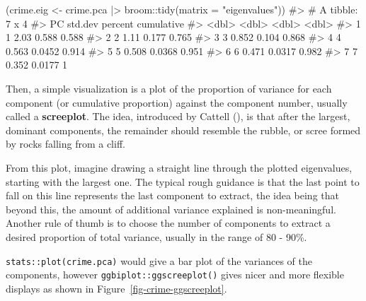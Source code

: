 \documentclass[
  letterpaper,
  10pt,
  krantz2]{krantz}
\makeatletter
\newenvironment{Shaded}{\begin{snugshade}}{\end{snugshade}}
\newcommand{\AttributeTok}[1]{\textcolor[rgb]{0.40,0.45,0.13}{#1}}
\newcommand{\CommentTok}[1]{\textcolor[rgb]{0.37,0.37,0.37}{#1}}
\newcommand{\FunctionTok}[1]{\textcolor[rgb]{0.28,0.35,0.67}{#1}}
\newcommand{\NormalTok}[1]{\textcolor[rgb]{0.00,0.23,0.31}{#1}}
\newcommand{\OtherTok}[1]{\textcolor[rgb]{0.00,0.23,0.31}{#1}}
\newcommand{\SpecialCharTok}[1]{\textcolor[rgb]{0.37,0.37,0.37}{#1}}
\newcommand{\StringTok}[1]{\textcolor[rgb]{0.13,0.47,0.30}{#1}}
\newenvironment{kframe}{%
  \medskip{}
  \setlength{\fboxsep}{.8em}
  \def\at@end@of@kframe{}%
  \ifinner\ifhmode%
  \def\at@end@of@kframe{\end{minipage}}%
  \begin{minipage}{\columnwidth}%
  \fi\fi%
  \def\FrameCommand##1{\hskip\@totalleftmargin \hskip-\fboxsep
  \colorbox{shadecolor}{##1}\hskip-\fboxsep
      \hskip-\linewidth \hskip-\@totalleftmargin \hskip\columnwidth}%
  \MakeFramed {\advance\hsize-\width
    \@totalleftmargin\z@ \linewidth\hsize
    \@setminipage}}%
{\par\unskip\endMakeFramed%
  \at@end@of@kframe}
\renewenvironment{Shaded}{\begin{kframe}}{\end{kframe}}
\makeatother
\begin{document}
\begin{Shaded}
\begin{Highlighting}[]
\NormalTok{(crime.eig }\OtherTok{\textless{}{-}}\NormalTok{ crime.pca }\SpecialCharTok{|\textgreater{}} 
\NormalTok{  broom}\SpecialCharTok{::}\FunctionTok{tidy}\NormalTok{(}\AttributeTok{matrix =} \StringTok{"eigenvalues"}\NormalTok{))}
\CommentTok{\#\textgreater{} \# A tibble: 7 x 4}
\CommentTok{\#\textgreater{}      PC std.dev percent cumulative}
\CommentTok{\#\textgreater{}   \textless{}dbl\textgreater{}   \textless{}dbl\textgreater{}   \textless{}dbl\textgreater{}      \textless{}dbl\textgreater{}}
\CommentTok{\#\textgreater{} 1     1   2.03   0.588       0.588}
\CommentTok{\#\textgreater{} 2     2   1.11   0.177       0.765}
\CommentTok{\#\textgreater{} 3     3   0.852  0.104       0.868}
\CommentTok{\#\textgreater{} 4     4   0.563  0.0452      0.914}
\CommentTok{\#\textgreater{} 5     5   0.508  0.0368      0.951}
\CommentTok{\#\textgreater{} 6     6   0.471  0.0317      0.982}
\CommentTok{\#\textgreater{} 7     7   0.352  0.0177      1}
\end{Highlighting}
\end{Shaded}

Then, a simple visualization is a plot of the proportion of variance for
each component (or cumulative proportion) against the component number,
usually called a \textbf{screeplot}. The idea, introduced by Cattell
(), is that after the largest, dominant
components, the remainder should resemble the rubble, or scree formed by
rocks falling from a cliff.

From this plot, imagine drawing a straight line through the plotted
eigenvalues, starting with the largest one. The typical rough guidance
is that the last point to fall on this line represents the last
component to extract, the idea being that beyond this, the amount of
additional variance explained is non-meaningful. Another rule of thumb
is to choose the number of components to extract a desired proportion of
total variance, usually in the range of 80 - 90\%.

\texttt{stats::plot(crime.pca)} would give a bar plot of the variances
of the components, however \texttt{ggbiplot::ggscreeplot()} gives nicer
and more flexible displays as shown in
Figure~\ref{fig-crime-ggscreeplot}.
\end{document}
